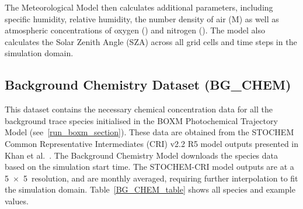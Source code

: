 The Meteorological Model then calculates additional parameters, including specific humidity, relative humidity, the number density of air (M) as well as atmospheric concentrations of oxygen () and nitrogen (). The model also calculates the Solar Zenith Angle (SZA) across all grid cells and time steps in the simulation domain.

\subsection{Background Chemistry Dataset (BG\_CHEM)}
This dataset contains the necessary chemical concentration data for all the background trace species initialised in the BOXM Photochemical Trajectory Model (see~\ref{run_boxm_section}). These data are obtained from the STOCHEM Common Representative Intermediates (CRI) v2.2 R5 model outputs presented in Khan et al.~\cite{Khan2021}. The Background Chemistry Model downloads the species data based on the simulation start time. The STOCHEM-CRI model outputs are at a 5\textdegree~$\times$~5\textdegree~resolution, and are monthly averaged, requiring further interpolation to fit the simulation domain. Table~\ref{BG_CHEM_table} shows all species and example values.

